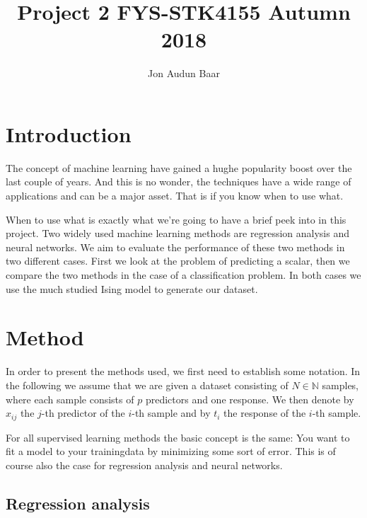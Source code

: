 \documentclass[a4paper,norsk]{article}
\title {Project 2 FYS-STK4155 Autumn 2018}
\author {Jon Audun Baar}
\begin{document}
\maketitle


\section{Introduction}
The concept of machine learning have gained a hughe popularity boost over 
the last couple of years. And this is no wonder, the techniques 
have a wide range of applications and can be a major asset. 
That is if you know when to use what.
\par
When to use what is exactly what we're going to have a brief
peek into in this project. Two widely used machine learning methods
are regression analysis and neural networks. 
We aim to evaluate the performance of these two methods in 
two different cases. 
First we look at the problem of predicting a scalar,
then we compare the two methods in the case of 
a classification problem. In both cases we use the much studied 
Ising model to generate our dataset.

\section{Method}
In order to present the methods used, 
we first need to establish some notation.
In the following we assume that we are given a dataset consisting of 
$N \in \mathbb{N}$ samples, where each sample consists of $p$ predictors
and one response. We then denote by $x_{ij}$ the $j$-th predictor of
the $i$-th sample and by $t_i$ the response of the $i$-th sample.
\par
For all supervised learning methods the basic concept is the same:
You want to fit a model to your trainingdata by minimizing some sort of 
error. This is of course also the case for regression analysis and neural 
networks. 

\subsection{Regression analysis}
\end{document}

